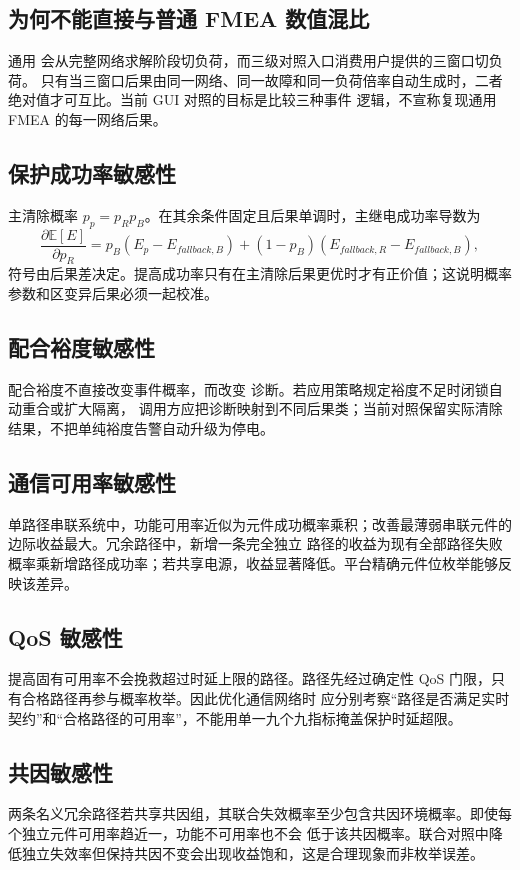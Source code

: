 \subsection{为何不能直接与普通 FMEA 数值混比}
通用  会从完整网络求解阶段切负荷，而三级对照入口消费用户提供的三窗口切负荷。
只有当三窗口后果由同一网络、同一故障和同一负荷倍率自动生成时，二者绝对值才可互比。当前 GUI 对照的目标是比较三种事件
逻辑，不宣称复现通用 FMEA 的每一网络后果。

\subsection{保护成功率敏感性}
主清除概率 $p_p=p_Rp_B$。在其余条件固定且后果单调时，主继电成功率导数为
\begin{equation}
 \frac{\partial\mathbb E[E]}{\partial p_R}
 =p_B(E_p-E_{fallback,B})+(1-p_B)(E_{fallback,R}-E_{fallback,B}),
\end{equation}
符号由后果差决定。提高成功率只有在主清除后果更优时才有正价值；这说明概率参数和区变异后果必须一起校准。

\subsection{配合裕度敏感性}
配合裕度不直接改变事件概率，而改变  诊断。若应用策略规定裕度不足时闭锁自动重合或扩大隔离，
调用方应把诊断映射到不同后果类；当前对照保留实际清除结果，不把单纯裕度告警自动升级为停电。

\subsection{通信可用率敏感性}
单路径串联系统中，功能可用率近似为元件成功概率乘积；改善最薄弱串联元件的边际收益最大。冗余路径中，新增一条完全独立
路径的收益为现有全部路径失败概率乘新增路径成功率；若共享电源，收益显著降低。平台精确元件位枚举能够反映该差异。

\subsection{QoS 敏感性}
提高固有可用率不会挽救超过时延上限的路径。路径先经过确定性 QoS 门限，只有合格路径再参与概率枚举。因此优化通信网络时
应分别考察“路径是否满足实时契约”和“合格路径的可用率”，不能用单一九个九指标掩盖保护时延超限。

\subsection{共因敏感性}
两条名义冗余路径若共享共因组，其联合失效概率至少包含共因环境概率。即使每个独立元件可用率趋近一，功能不可用率也不会
低于该共因概率。联合对照中降低独立失效率但保持共因不变会出现收益饱和，这是合理现象而非枚举误差。

